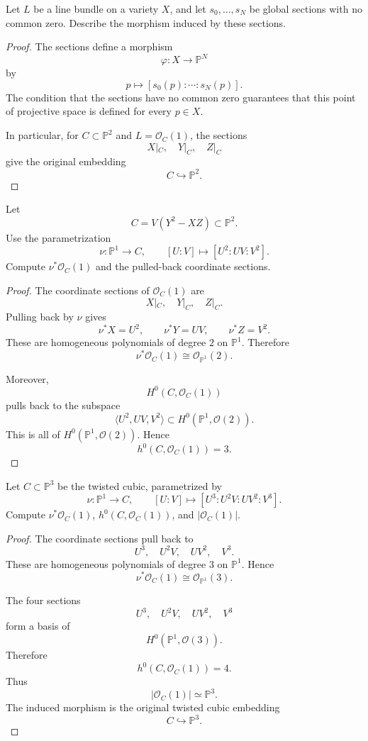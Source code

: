 \begin{exercise}
\label{exercise-sections-map}
Let $L$ be a line bundle on a variety $X$,
and let $s_0,\ldots,s_N$ be global
sections with no common zero. Describe
the morphism induced by these sections.
\end{exercise}

\begin{proof}
The sections define a morphism
$$
  \varphi:X\to \mathbb P^N
$$
by
$$
  p\mapsto [s_0(p):\cdots:s_N(p)].
$$
The condition that the sections have no
common zero guarantees that this point of
projective space is defined for every
$p\in X$.

In particular, for
$C\subset \mathbb P^2$ and
$L=\mathcal O_C(1)$, the sections
$$
  X|_C,\quad Y|_C,\quad Z|_C
$$
give the original embedding
$$
  C\hookrightarrow \mathbb P^2.
$$
\end{proof}

\begin{exercise}
\label{exercise-conic-pullback}
Let
$$
  C=V(Y^2-XZ)\subset \mathbb P^2.
$$
Use the parametrization
$$
  \nu:\mathbb P^1\to C,
  \qquad
  [U:V]\mapsto [U^2:UV:V^2].
$$
Compute $\nu^*\mathcal O_C(1)$ and the
pulled-back coordinate sections.
\end{exercise}

\begin{proof}
The coordinate sections of
$\mathcal O_C(1)$ are
$$
  X|_C,\quad Y|_C,\quad Z|_C.
$$
Pulling back by $\nu$ gives
$$
  \nu^*X=U^2,
  \qquad
  \nu^*Y=UV,
  \qquad
  \nu^*Z=V^2.
$$
These are homogeneous polynomials of
degree $2$ on $\mathbb P^1$. Therefore
$$
  \nu^*\mathcal O_C(1)
  \cong
  \mathcal O_{\mathbb P^1}(2).
$$

Moreover,
$$
  H^0(C,\mathcal O_C(1))
$$
pulls back to the subspace
$$
  \langle U^2,UV,V^2\rangle
  \subset
  H^0(\mathbb P^1,\mathcal O(2)).
$$
This is all of
$H^0(\mathbb P^1,\mathcal O(2))$.
Hence
$$
  h^0(C,\mathcal O_C(1))=3.
$$
\end{proof}

\begin{exercise}
\label{exercise-twisted-cubic}
Let $C\subset \mathbb P^3$ be the
twisted cubic, parametrized by
$$
  \nu:\mathbb P^1\to C,
  \qquad
  [U:V]\mapsto
  [U^3:U^2V:UV^2:V^3].
$$
Compute $\nu^*\mathcal O_C(1)$,
$h^0(C,\mathcal O_C(1))$, and
$|\mathcal O_C(1)|$.
\end{exercise}

\begin{proof}
The coordinate sections pull back to
$$
  U^3,\quad U^2V,\quad UV^2,\quad V^3.
$$
These are homogeneous polynomials of
degree $3$ on $\mathbb P^1$. Hence
$$
  \nu^*\mathcal O_C(1)
  \cong
  \mathcal O_{\mathbb P^1}(3).
$$

The four sections
$$
  U^3,\quad U^2V,\quad UV^2,\quad V^3
$$
form a basis of
$$
  H^0(\mathbb P^1,\mathcal O(3)).
$$
Therefore
$$
  h^0(C,\mathcal O_C(1))=4.
$$
Thus
$$
  |\mathcal O_C(1)|
  \simeq
  \mathbb P^3.
$$
The induced morphism is the original
twisted cubic embedding
$$
  C\hookrightarrow \mathbb P^3.
$$
\end{proof}


